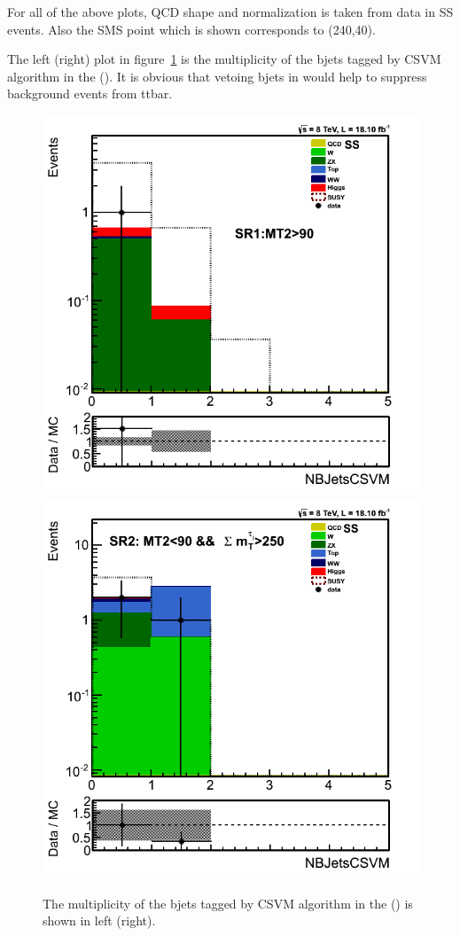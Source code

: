 For all of the above plots, QCD shape and normalization is taken from data in SS events. Also the SMS point which is shown corresponds to (240,40).

The left (right) plot in figure~\ref{fig:nbjets} is the multiplicity of the bjets tagged by CSVM algorithm in the \binone (\bintwo). It is obvious that vetoing bjets in \bintwo would help to suppress background events from ttbar. 

\begin{figure}[!Hhtb]
\centering
\includegraphics[angle=0,scale=0.35]{TauTauFigs/SR1NBJetsCSVM.png}
\includegraphics[angle=0,scale=0.35]{TauTauFigs/SR2NBJetsCSVM.png} \\
\caption{The multiplicity of the bjets tagged by CSVM algorithm in the \binone (\bintwo) is shown in left (right).}
\label{fig:nbjets}
\end{figure}

